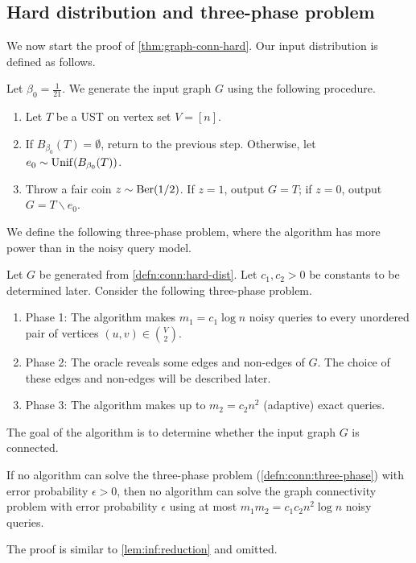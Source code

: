 \subsection{Hard distribution and three-phase problem} \label{sec:conn:init}
We now start the proof of \cref{thm:graph-conn-hard}.
Our input distribution is defined as follows.
\begin{definition} \label{defn:conn:hard-dist}
  Let $\beta_0=\frac 1{21}$.
  We generate the input graph $G$ using the following procedure.
  \begin{enumerate}[label=(\arabic*)]
    \item Let $T$ be a UST on vertex set $V=[n]$.
    \item If $B_{\beta_0}(T)=\emptyset$, return to the previous step.
    Otherwise, let $e_0\sim \operatorname{\mathrm{Unif}}(B_{\beta_0}(T))$.
    \item Throw a fair coin $z\sim \operatorname{\mathrm{Ber}}(1/2)$.
    If $z=1$, output $G=T$; if $z=0$, output $G=T\backslash e_0$.
  \end{enumerate}
\end{definition}

We define the following three-phase problem, where the algorithm has more power than in the noisy query model.
\begin{definition} \label{defn:conn:three-phase}
  Let $G$ be generated from \cref{defn:conn:hard-dist}.
  Let $c_1,c_2>0$ be constants to be determined later.
  Consider the following three-phase problem.
  \begin{enumerate}[label=\arabic*.]
    \item \label{item:sec:conn:phase-1} Phase 1: The algorithm makes $m_1=c_1\log n$ noisy queries to every unordered pair of vertices $(u,v)\in \binom V2$.
    \item \label{item:sec:conn:phase-2} Phase 2: The oracle reveals some edges and non-edges of $G$. The choice of these edges and non-edges will be described later.
    \item \label{item:sec:conn:phase-3} Phase 3: The algorithm makes up to $m_2=c_2 n^2$ (adaptive) exact queries.
  \end{enumerate}
  The goal of the algorithm is to determine whether the input graph $G$ is connected.
\end{definition}

\begin{lemma} \label{lem:conn:reduction}
  If no algorithm can solve the three-phase problem (\cref{defn:conn:three-phase}) with error probability $\epsilon>0$, then no algorithm can solve the graph connectivity problem with error probability $\epsilon$ using at most $m_1 m_2 = c_1 c_2 n^2 \log n$ noisy queries.
\end{lemma}
The proof is similar to \cref{lem:inf:reduction} and omitted.



